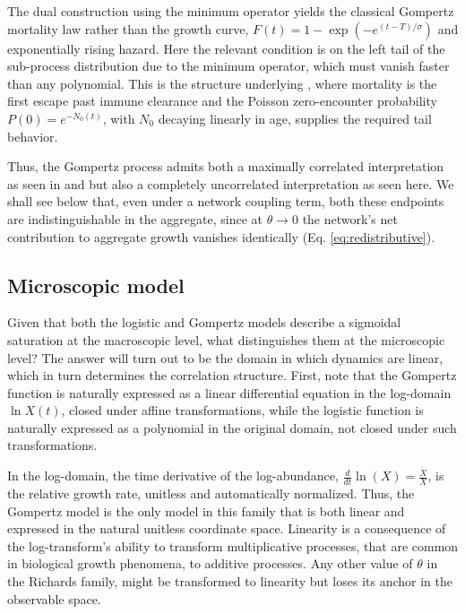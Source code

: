 \documentclass{article}
\begin{document}
The dual construction using the minimum operator yields the classical Gompertz mortality law rather than the growth curve, $F(t) = 1 - \exp\!\left(-e^{(t-T)/\sigma}\right)$ and exponentially rising hazard. Here the relevant condition is on the left tail of the sub-process distribution due to the minimum operator, which must vanish faster than any polynomial. This is the structure underlying \citet{shklovskii2005simple}, where mortality is the first escape past immune clearance and the Poisson zero-encounter probability $P(0)=e^{-N_0(t)}$, with $N_0$ decaying linearly in age, supplies the required tail behavior.

Thus, the Gompertz process admits both a maximally correlated interpretation as seen in \citet{kendal1985gompertzian} and \citet{petroni2020gompertz} but also a completely uncorrelated interpretation as seen here. We shall see below that, even under a network coupling term, both these endpoints are indistinguishable in the aggregate, since at $\theta\to0$ the network's net contribution to aggregate growth vanishes identically (Eq. \ref{eq:redistributive}).


\subsection{Microscopic model}
Given that both the logistic and Gompertz models describe a sigmoidal saturation at the macroscopic level, what distinguishes them at the microscopic level? The answer will turn out to be the domain in which dynamics are linear, which in turn determines the correlation structure. First, note that the Gompertz function is naturally expressed as a linear differential equation in the log-domain $\ln{X(t)}$, closed under affine transformations, while the logistic function is naturally expressed as a polynomial in the original domain, not closed under such transformations. 

In the log-domain, the time derivative of the log-abundance, $\frac{d}{dt}\ln(X)=\frac{\dot{X}}{X}$, is the relative growth rate, unitless and automatically normalized. Thus, the Gompertz model is the only model in this family that is both linear and expressed in the natural unitless coordinate space. Linearity is a consequence of the log-transform's ability to transform multiplicative processes, that are common in biological growth phenomena, to additive processes. Any other value of $\theta$ in the Richards family, might be transformed to linearity but loses its anchor in the observable space. 
\end{document}
